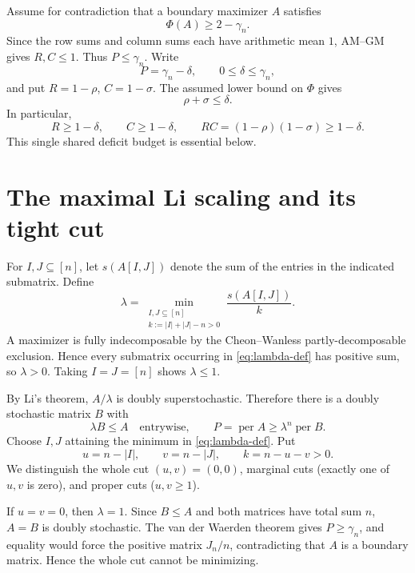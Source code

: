 \documentclass[11pt]{article}
\theoremstyle{remark}
\newcommand{\per}{\operatorname{per}}
\newcommand{\PhiD}{\Phi}
\begin{document}
Assume for contradiction that a boundary maximizer $A$ satisfies
\[
 \PhiD(A)\ge 2-\gamma_n.
\]
Since the row sums and column sums each have arithmetic mean $1$, AM--GM gives $R,C\le1$. Thus $P\le\gamma_n$. Write
\[
 P=\gamma_n-\delta,\qquad 0\le\delta\le\gamma_n,
\]
and put $R=1-\rho$, $C=1-\sigma$. The assumed lower bound on $\PhiD$ gives
\begin{equation}\label{eq:joint-deficit}
 \rho+\sigma\le\delta.
\end{equation}
In particular,
\begin{equation}\label{eq:product-lower}
 R\ge1-\delta,\qquad C\ge1-\delta,
 \qquad RC=(1-\rho)(1-\sigma)\ge1-\delta.
\end{equation}
This single shared deficit budget is essential below.

\section{The maximal Li scaling and its tight cut}
For $I,J\subseteq[n]$, let $s(A[I,J])$ denote the sum of the entries in the indicated submatrix. Define
\begin{equation}\label{eq:lambda-def}
 \lambda=
 \min_{\substack{I,J\subseteq[n]\\k:=|I|+|J|-n>0}}
 \frac{s(A[I,J])}{k}.
\end{equation}
A maximizer is fully indecomposable by the Cheon--Wanless partly-decomposable exclusion. Hence every submatrix occurring in \eqref{eq:lambda-def} has positive sum, so $\lambda>0$. Taking $I=J=[n]$ shows $\lambda\le1$.

By Li's theorem, $A/\lambda$ is doubly superstochastic. Therefore there is a doubly stochastic matrix $B$ with
\begin{equation}\label{eq:domination}
 \lambda B\le A
 \quad\text{entrywise},
 \qquad
 P=\per A\ge\lambda^n\per B.
\end{equation}
Choose $I,J$ attaining the minimum in \eqref{eq:lambda-def}. Put
\[
 u=n-|I|,\qquad v=n-|J|,\qquad k=n-u-v>0.
\]
We distinguish the whole cut $(u,v)=(0,0)$, marginal cuts (exactly one of $u,v$ is zero), and proper cuts ($u,v\ge1$).

If $u=v=0$, then $\lambda=1$. Since $B\le A$ and both matrices have total sum $n$, $A=B$ is doubly stochastic. The van der Waerden theorem gives $P\ge\gamma_n$, and equality would force the positive matrix $J_n/n$, contradicting that $A$ is a boundary matrix. Hence the whole cut cannot be minimizing.
\end{document}
